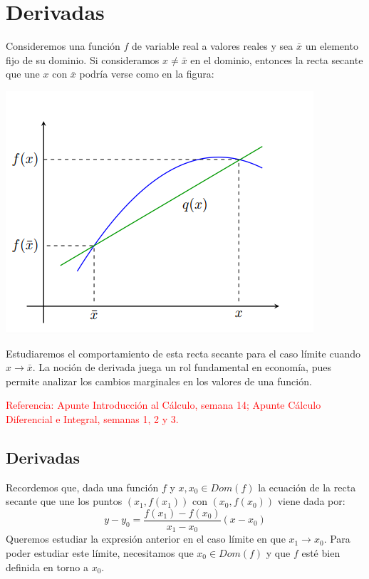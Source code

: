 
\section{Derivadas}


Consideremos una función $f$ de variable real a valores reales y sea $\bar{x}$ un elemento fijo de su dominio. Si consideramos $x \neq \bar{x}$ en el dominio, entonces la recta secante que une $x$ con $\bar{x}$ podría verse como en la figura: 
\begin{center}
	\includegraphics[scale=0.5]{figuras/capitulo1/05-derivadas/intro.png}
\end{center}
Estudiaremos el comportamiento de esta recta secante para el caso límite cuando $x \rightarrow \bar{x}$.
La noción de derivada juega un rol fundamental en economía, pues permite analizar los cambios marginales en los valores de una función. 

\textcolor{red}{Referencia: Apunte Introducción al Cálculo, semana 14; Apunte Cálculo Diferencial e Integral, semanas 1, 2 y 3.} 

\subsection{Derivadas}

Recordemos que, dada una función $f$ y $x, x_0 \in Dom(f)$ la ecuación de la recta secante que une los puntos $(x_1, f(x_1))$ con $(x_0, f(x_0))$ viene dada por: 
$$ y - y_0 = \dfrac{f(x_1) - f(x_0)}{x_1  - x_0} (x-x_0) $$ 		
Queremos estudiar la expresión anterior en el caso límite en que $x_1 \rightarrow x_0$. 
Para poder estudiar este límite, necesitamos que $x_0 \in Dom(f)$ y que $f$ esté bien definida en torno a $x_0$. 


